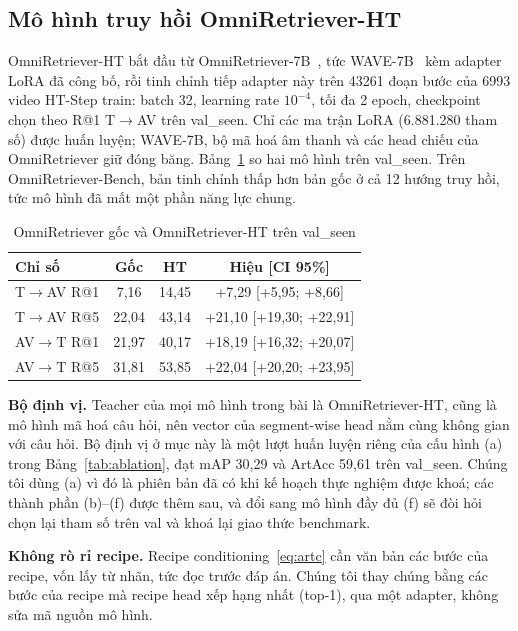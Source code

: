 \documentclass{IEEEtran}
\begin{document}
\subsection{Mô hình truy hồi OmniRetriever-HT}
OmniRetriever-HT bắt đầu từ OmniRetriever-7B~\cite{omniretriever}, tức WAVE-7B~\cite{wave} kèm adapter LoRA đã công bố, rồi tinh chỉnh tiếp adapter này trên 43261 đoạn bước của 6993 video HT-Step train: batch 32, learning rate $10^{-4}$, tối đa 2 epoch, checkpoint chọn theo R@1 T$\to$AV trên val\_seen. Chỉ các ma trận LoRA (6.881.280 tham số) được huấn luyện; WAVE-7B, bộ mã hoá âm thanh và các head chiếu của OmniRetriever giữ đóng băng. Bảng~\ref{tab:ret_omni} so hai mô hình trên val\_seen. Trên OmniRetriever-Bench, bản tinh chỉnh thấp hơn bản gốc ở cả 12 hướng truy hồi, tức mô hình đã mất một phần năng lực chung.

\begin{table}[t]
\caption{OmniRetriever gốc và OmniRetriever-HT trên val\_seen}
\label{tab:ret_omni}
\setlength{\tabcolsep}{3pt}
\centering
\begin{tabular}{|l|c|c|c|}
\hline
Chỉ số & Gốc & HT & Hiệu [CI 95\%] \\
\hline
T$\to$AV R@1 & 7,16 & 14,45 & +7,29 [+5,95; +8,66] \\
T$\to$AV R@5 & 22,04 & 43,14 & +21,10 [+19,30; +22,91] \\
AV$\to$T R@1 & 21,97 & 40,17 & +18,19 [+16,32; +20,07] \\
AV$\to$T R@5 & 31,81 & 53,85 & +22,04 [+20,20; +23,95] \\
\hline
\end{tabular}
\end{table}

\textbf{Bộ định vị.} Teacher của mọi mô hình trong bài là OmniRetriever-HT, cũng là mô hình mã hoá câu hỏi, nên vector của segment-wise head nằm cùng không gian với câu hỏi. Bộ định vị ở mục này là một lượt huấn luyện riêng của cấu hình (a) trong Bảng~\ref{tab:ablation}, đạt mAP 30,29 và ArtAcc 59,61 trên val\_seen. Chúng tôi dùng (a) vì đó là phiên bản đã có khi kế hoạch thực nghiệm được khoá; các thành phần (b)--(f) được thêm sau, và đổi sang mô hình đầy đủ (f) sẽ đòi hỏi chọn lại tham số trên val và khoá lại giao thức benchmark.

\textbf{Không rò rỉ recipe.} Recipe conditioning~\eqref{eq:artc} cần văn bản các bước của recipe, vốn lấy từ nhãn, tức đọc trước đáp án. Chúng tôi thay chúng bằng các bước của recipe mà recipe head xếp hạng nhất (top-1), qua một adapter, không sửa mã nguồn mô hình.
\end{document}
